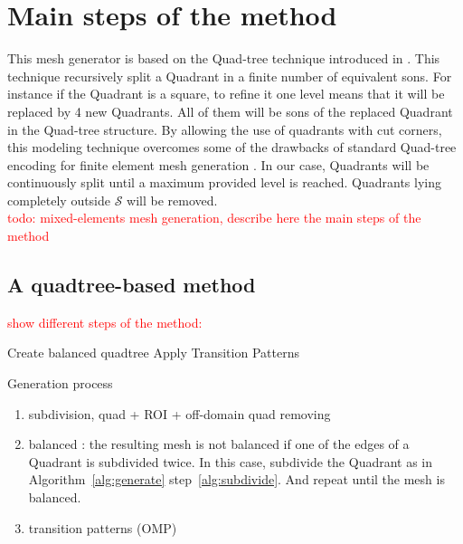 \documentclass[10pt]{article}
\begin{document}
\section{Main steps of the method}
\label{sec:method}
This mesh generator is based on the Quad-tree technique introduced in \cite{Finkel1974}. This technique recursively split a Quadrant in a finite number of equivalent sons. For instance if the Quadrant is a square, to refine it one level means that it will be replaced by 4 new Quadrants. All of them will be sons of the replaced Quadrant in the Quad-tree structure. By allowing the use of quadrants with cut corners, this modeling technique overcomes some of the drawbacks of standard Quad-tree encoding for finite element mesh generation \cite{Yerry1983}.
In our case, Quadrants will be continuously split until a maximum provided level is reached. Quadrants lying completely outside $\mathcal{S}$ will be removed.\\

\textcolor{red}{todo: mixed-elements mesh generation, describe here the main steps of the method}

\subsection{A quadtree-based method}
\textcolor{red}{show different steps of the method: }

\begin{algorithm}[H]
\SetAlgoLined
{}
 \nl {}
 \nl Create balanced quadtree\; \label{alg:goto}
 \nl Apply Transition Patterns\; \label{alg:trans}
 \caption{Generation process}
 \label{alg:generate}
\end{algorithm}


\begin{enumerate}
\item subdivision, quad + ROI + off-domain quad removing
\item balanced : the resulting mesh is not balanced if one of the edges of a Quadrant is subdivided twice. In this case, subdivide the Quadrant as in Algorithm~\ref{alg:generate} step~\ref{alg:subdivide}. And repeat until the mesh is balanced.
\item transition patterns (OMP)
\end{enumerate}
\end{document}
